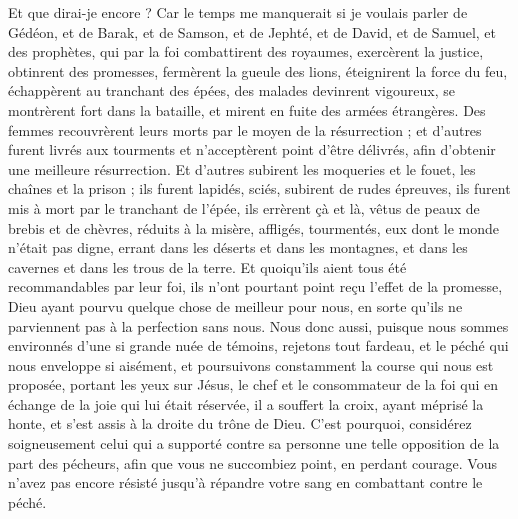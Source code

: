 \begin{multicols}{2}
Et que dirai-je encore ? Car le temps me manquerait si je voulais parler de Gédéon, et de Barak, et de Samson, et de Jephté, et de David, et de Samuel, et des prophètes,
qui par la foi combattirent des royaumes, exercèrent la justice, obtinrent des promesses, fermèrent la gueule des lions,
éteignirent la force du feu, échappèrent au tranchant des épées, des malades devinrent vigoureux, se montrèrent fort dans la bataille, et mirent en fuite des armées étrangères.
Des femmes recouvrèrent leurs morts par le moyen de la résurrection ; et d'autres furent livrés aux tourments et n'acceptèrent point d'être délivrés, afin d'obtenir une meilleure résurrection.
Et d'autres subirent les moqueries et le fouet, les chaînes et la prison ;
ils furent lapidés, sciés, subirent de rudes épreuves, ils furent mis à mort par le tranchant de l'épée, ils errèrent çà et là, vêtus de peaux de brebis et de chèvres, réduits à la misère, affligés, tourmentés,
eux dont le monde n'était pas digne, errant dans les déserts et dans les montagnes, et dans les cavernes et dans les trous de la terre.
 Et quoiqu'ils aient tous été recommandables par leur foi, ils n'ont pourtant point reçu l'effet de la promesse,
Dieu ayant pourvu quelque chose de meilleur pour nous, en sorte qu'ils ne parviennent pas à la perfection sans nous.
\VerseOne{}Nous donc aussi, puisque nous sommes environnés d'une si grande nuée de témoins, rejetons tout fardeau, et le péché qui nous enveloppe si aisément, et poursuivons constamment la course qui nous est proposée,
portant les yeux sur Jésus, le chef et le consommateur de la foi qui en échange de la joie qui lui était réservée, il a souffert la croix, ayant méprisé la honte, et s'est assis à la droite du trône de Dieu.
C'est pourquoi, considérez soigneusement celui qui a supporté contre sa personne une telle opposition de la part des pécheurs, afin que vous ne succombiez point, en perdant courage.
Vous n'avez pas encore résisté jusqu'à répandre votre sang en combattant contre le péché.

\end{multicols}
